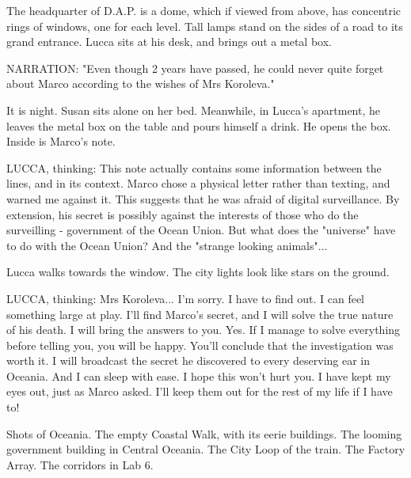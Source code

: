 \documentclass[11pt]{article}
\begin{document}
The headquarter of D.A.P. is a dome, which if viewed from above, has concentric rings of windows, one for each level. 
Tall lamps stand on the sides of a road to its grand entrance. 
Lucca sits at his desk, and brings out a metal box. 

NARRATION: "Even though 2 years have passed, he could never quite forget about Marco according to the wishes of Mrs Koroleva."

It is night. Susan sits alone on her bed. 
Meanwhile, in Lucca's apartment, he leaves the metal box on the table and pours himself a drink. 
He opens the box. Inside is Marco's note. 

LUCCA, thinking: This note actually contains some information between the lines, and in its context. 
Marco chose a physical letter rather than texting, and warned me against it. 
This suggests that he was afraid of digital surveillance. 
By extension, his secret is possibly against the interests of those who do the surveilling - government of the Ocean Union. 
But what does the "universe" have to do with the Ocean Union?
And the "strange looking animals"... 

Lucca walks towards the window. The city lights look like stars on the ground. 

LUCCA, thinking: 
Mrs Koroleva... I'm sorry. I have to find out. I can feel something large at play. 
I'll find Marco's secret, and I will solve the true nature of his death. 
I will bring the answers to you. Yes. 
If I manage to solve everything before telling you, you will be happy. 
You'll conclude that the investigation was worth it. 
I will broadcast the secret he discovered to every deserving ear in Oceania.
And I can sleep with ease. 
I hope this won't hurt you. 
I have kept my eyes out, just as Marco asked. I'll keep them out for the rest of my life if I have to!

Shots of Oceania. 
The empty Coastal Walk, with its eerie buildings. 
The looming government building in Central Oceania. 
The City Loop of the train. 
The Factory Array.
The corridors in Lab 6.
\end{document}
